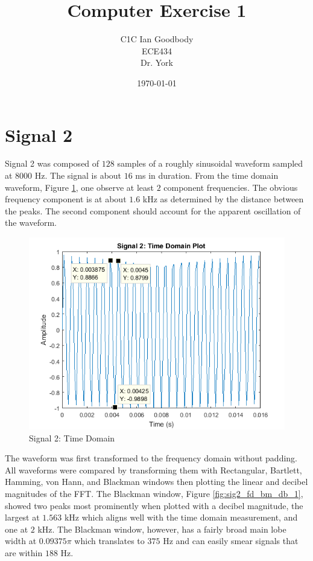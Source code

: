 \documentclass[pdftex, 10pt]{IEEEtran}
\begin{document}
\title{Computer Exercise 1}
\author{C1C Ian Goodbody\\ECE434\\Dr. York}
\date{\today}
\maketitle

\section{Signal 2}
Signal 2 was composed of $128$ samples of a roughly sinusoidal waveform sampled
at $8000$ Hz. The signal is about $16$ ms in duration. From the time domain waveform, Figure \ref{fig:sig2_td},
one observe at least $2$ component frequencies. The obvious frequency component is at about $1.6$ kHz as determined by
the distance between the peaks. The second component should account for the apparent oscillation of the waveform.

\begin{figure}
    \centering
    \includegraphics[scale=0.5]{sig2_td}
    \caption{Signal 2: Time Domain}
    \label{fig:sig2_td} 
\end{figure}

The waveform was first transformed to the frequency domain without padding. All waveforms were compared by transforming
them with Rectangular, Bartlett, Hamming, von Hann, and Blackman windows then plotting the linear and decibel magnitudes
of the FFT. 
The Blackman window, Figure \ref{fig:sig2_fd_bm_db_1}, showed two peaks most prominently when plotted with a 
decibel magnitude, the largest at $1.563$ kHz which aligns well with the time domain measurement, 
and one at $2$ kHz. The Blackman window, however, has a fairly broad main lobe width at $0.09375\pi$ which translates
to $375$ Hz and can easily smear signals that are within $188$ Hz. 
\end{document}

